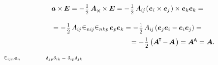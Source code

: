 \begin{otherlanguage}{russian}
\nopagebreak\vspace{-0.1em}\[\begin{array}{c}
\bm{a} \times\hspace{-0.1ex} \bm{E} = - \hspace{.2ex} \smalldisplaystyleonehalf \hspace{.4ex} \bm{A}_{\Xcompanion} \times \bm{E} = - \hspace{.2ex} \smalldisplaystyleonehalf \, A_{i\hspace{-0.1ex}j} \hspace{-0.2ex}
\left( \hspace{.08ex} \tikzmark{beginFirstCrossProduct} {\bm{e}_i \times \bm{e}_j} \tikzmark{endFirstCrossProduct} \hspace{.16ex} \right)
\times \bm{e}_k \bm{e}_k = \\[1.5em]
%
= - \hspace{.2ex} \smalldisplaystyleonehalf \hspace{.32ex} A_{i\hspace{-0.1ex}j} \hspace{.12ex}
\tikzmark{beginTwoLeviCivitas} \levicivita_{ni\hspace{-0.1ex}j} \levicivita_{nkp} \tikzmark{endTwoLeviCivitas}
\hspace{.32ex} \bm{e}_p \bm{e}_k = - \hspace{.2ex} \smalldisplaystyleonehalf \hspace{.32ex} A_{i\hspace{-0.1ex}j} \hspace{-0.1ex} \left( \bm{e}_j \bm{e}_i - \bm{e}_i \bm{e}_j \right) = \\[.8em]
%
\hspace{13.2em}= - \hspace{.2ex} \smalldisplaystyleonehalf \left({ \bm{A}^{\hspace{-0.1em}\T} \hspace{-0.25ex} - \hspace{-0.2ex} \bm{A} \hspace{0.2ex}}\right) = \bm{A}^{\mathsf{\hspace{-0.1ex}A}} = \bm{A}.
\end{array}\]
%
{${\scriptstyle \levicivita_{i\hspace{-0.1ex}jn} \bm{e}_n}$}
%
{${\scriptstyle \hspace{3.2em}\delta_{jp} \delta_{ik} \,-\; \delta_{ip} \delta_{jk}}$}


\end{otherlanguage}
